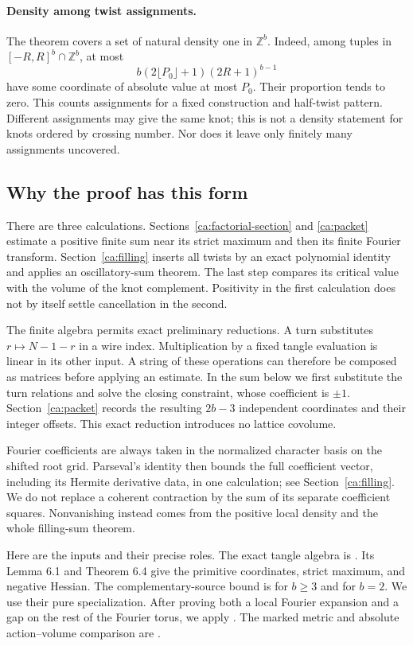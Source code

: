 \paragraph{Density among twist assignments.}
The theorem covers a set of natural density one in $\mathbb Z^b$.
Indeed, among tuples in $[-R,R]^b\cap\mathbb Z^b$, at most
\[
 b(2\lfloor P_0\rfloor+1)(2R+1)^{b-1}
\]
have some coordinate of absolute value at most $P_0$. Their proportion
tends to zero. This counts assignments for a fixed construction and
half-twist pattern. Different assignments may give the same knot; this
is not a density statement for knots ordered by crossing number. Nor
does it leave only finitely many assignments uncovered.

\subsection{Why the proof has this form}

There are three calculations. Sections~\ref{ca:factorial-section}
and \ref{ca:packet} estimate a positive finite sum near its strict
maximum and then its finite Fourier transform. Section~\ref{ca:filling}
inserts all twists by an exact polynomial identity and applies an
oscillatory-sum theorem. The last step compares its critical value
with the volume of the knot complement. Positivity in the first
calculation does not by itself settle cancellation in the second.

The finite algebra permits exact preliminary reductions. A turn substitutes
$r\mapsto N-1-r$ in a wire index. Multiplication by a fixed tangle
evaluation is linear in its other input. A string of these operations
can therefore be composed as matrices before applying an estimate.
In the sum below we first
substitute the turn relations and solve the closing constraint, whose
coefficient is $\pm1$. Section~\ref{ca:packet} records the resulting
$2b-3$ independent coordinates and their integer offsets. This exact
reduction introduces no lattice covolume.

Fourier coefficients are always taken in the normalized character
basis on the shifted root grid. Parseval's identity then bounds the
full coefficient vector, including its Hermite derivative data, in
one calculation; see Section~\ref{ca:filling}. We do not replace a
coherent contraction by the sum of its separate coefficient squares.
Nonvanishing instead comes from the positive local density and the
whole filling-sum theorem.

Here are the inputs and their precise roles. The exact tangle algebra
is \cite[Proposition 3.2, Theorem 3.3, Proposition 4.1 and
equation (4.8)]{Newton}. Its Lemma 6.1 and Theorem 6.4 give the
primitive coordinates, strict maximum, and negative Hessian.
The complementary-source bound is \cite[Theorem 1.1]{Bounds} for
$b\ge3$ and \cite[Corollary 9.1]{Bounds} for $b=2$.
We use their pure specialization. After proving both a local Fourier
expansion and a gap on the rest of the Fourier torus, we apply
\cite[Theorem 1.1]{Filling}. The marked metric and absolute
action--volume comparison are \cite[Theorem 1.3]{StrictGeometry}.

